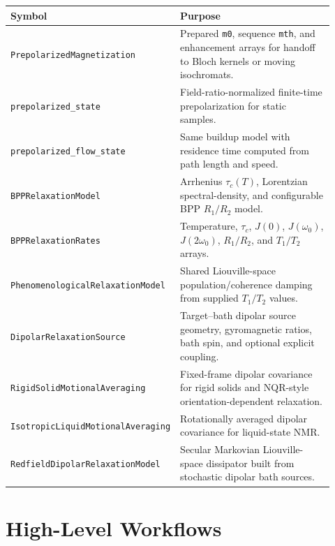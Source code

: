 \documentclass[11pt,oneside]{report}
\newcommand{\code}[1]{\texttt{#1}}
\begin{document}
\begin{longtable}{p{0.43\linewidth}p{0.49\linewidth}}
\toprule
Symbol & Purpose \\
\midrule
\code{PrepolarizedMagnetization} & Prepared \code{m0}, sequence \code{mth}, and enhancement arrays for handoff to Bloch kernels or moving isochromats. \\
\code{prepolarized\_state} & Field-ratio-normalized finite-time prepolarization for static samples. \\
\code{prepolarized\_flow\_state} & Same buildup model with residence time computed from path length and speed. \\
\code{BPPRelaxationModel} & Arrhenius \(\tau_c(T)\), Lorentzian spectral-density, and configurable BPP \(R_1/R_2\) model. \\
\code{BPPRelaxationRates} & Temperature, \(\tau_c\), \(J(0)\), \(J(\omega_0)\), \(J(2\omega_0)\), \(R_1/R_2\), and \(T_1/T_2\) arrays. \\
\code{PhenomenologicalRelaxationModel} & Shared Liouville-space population/coherence damping from supplied \(T_1/T_2\) values. \\
\code{DipolarRelaxationSource} & Target--bath dipolar source geometry, gyromagnetic ratios, bath spin, and optional explicit coupling. \\
\code{RigidSolidMotionalAveraging} & Fixed-frame dipolar covariance for rigid solids and NQR-style orientation-dependent relaxation. \\
\code{IsotropicLiquidMotionalAveraging} & Rotationally averaged dipolar covariance for liquid-state NMR. \\
\code{RedfieldDipolarRelaxationModel} & Secular Markovian Liouville-space dissipator built from stochastic dipolar bath sources. \\
\bottomrule
\end{longtable}

\section{High-Level Workflows}
\end{document}

